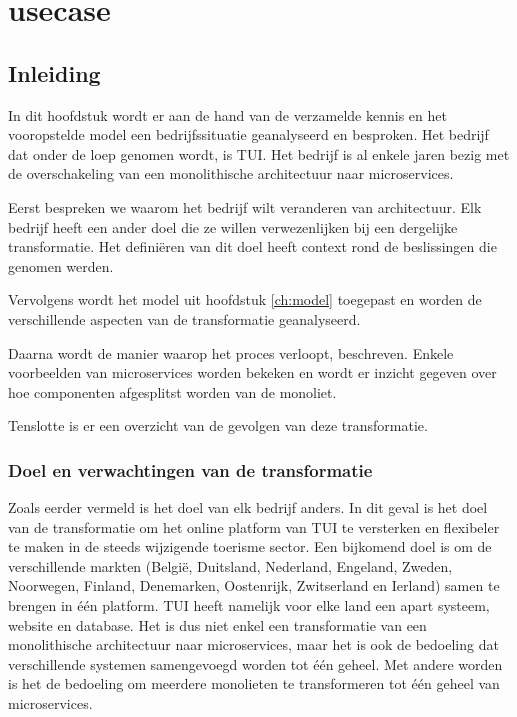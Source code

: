 
\chapter{usecase}
\label{ch:usecase}

\section{Inleiding}

In dit hoofdstuk wordt er aan de hand van de verzamelde kennis en het vooropstelde model een bedrijfssituatie geanalyseerd en besproken. Het bedrijf dat onder de loep genomen wordt, is TUI. Het bedrijf is al enkele jaren bezig met de overschakeling van een monolithische architectuur naar microservices. 

Eerst bespreken we waarom het bedrijf wilt veranderen van architectuur. Elk bedrijf heeft een ander doel die ze willen verwezenlijken bij een dergelijke transformatie. Het definiëren van dit doel heeft context rond de beslissingen die genomen werden.

Vervolgens wordt het model uit hoofdstuk \ref{ch:model} toegepast en worden de verschillende aspecten van de transformatie geanalyseerd.

Daarna wordt de manier waarop het proces verloopt, beschreven. Enkele voorbeelden van microservices worden bekeken en wordt er inzicht gegeven over hoe componenten afgesplitst worden van de monoliet. 

Tenslotte is er een overzicht van de gevolgen van deze transformatie.

\subsection{Doel en verwachtingen van de transformatie}

Zoals eerder vermeld is het doel van elk bedrijf anders. In dit geval is het doel van de transformatie om het online platform van TUI te versterken en flexibeler te maken in de steeds wijzigende toerisme sector. Een bijkomend doel is om de verschillende markten (België, Duitsland, Nederland, Engeland, Zweden, Noorwegen, Finland, Denemarken, Oostenrijk, Zwitserland en Ierland) samen te brengen in één platform. TUI heeft namelijk voor elke land een apart systeem, website en database. Het is dus niet enkel een transformatie van een monolithische architectuur naar microservices, maar het is ook de bedoeling dat verschillende systemen samengevoegd worden tot één geheel. Met andere worden is het de bedoeling om meerdere monolieten te transformeren tot één geheel van microservices.  

